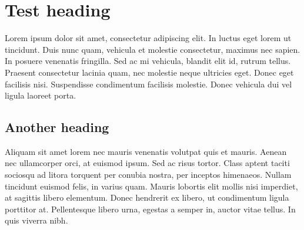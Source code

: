 \documentclass[12pt]{article}
\begin{document}
\section{Test heading}

Lorem ipsum dolor sit amet, consectetur adipiscing elit. In luctus
eget lorem ut tincidunt. Duis nunc quam, vehicula et molestie
consectetur, maximus nec sapien. In posuere venenatis fringilla. Sed
ac mi vehicula, blandit elit id, rutrum tellus. Praesent consectetur
lacinia quam, nec molestie neque ultricies eget. Donec eget facilisis
nisi. Suspendisse condimentum facilisis molestie. Donec vehicula dui
vel ligula laoreet porta.

\subsection{Another heading}

Aliquam sit amet lorem nec mauris venenatis volutpat quis et
mauris. Aenean nec ullamcorper orci, at euismod ipsum. Sed ac risus
tortor. Class aptent taciti sociosqu ad litora torquent per conubia
nostra, per inceptos himenaeos. Nullam tincidunt euismod felis, in
varius quam. Mauris lobortis elit mollis nisi imperdiet, at sagittis
libero elementum. Donec hendrerit ex libero, ut condimentum ligula
porttitor at. Pellentesque libero urna, egestas a semper in, auctor
vitae tellus. In quis viverra nibh.
\end{document}
